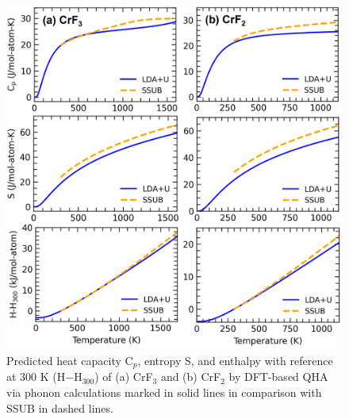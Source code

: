 \begin{figure}[h]
    \centering
    \includegraphics[width=0.75\linewidth]{moltensalts/Moltensalts-FLiNaKCr-Benchmark-Cr.jpg}
    \caption{Predicted heat capacity C$_p$, entropy S, and enthalpy with reference at 300 K (H$-$H$_{300}$) of (a) CrF$_3$ and (b) CrF$_2$ by DFT-based QHA via phonon calculations marked in solid lines in comparison with SSUB \cite{sgteurl} in dashed lines.}
    \label{ms:fig:FLiNaKCr-Benchmark-Cr}
\end{figure}

